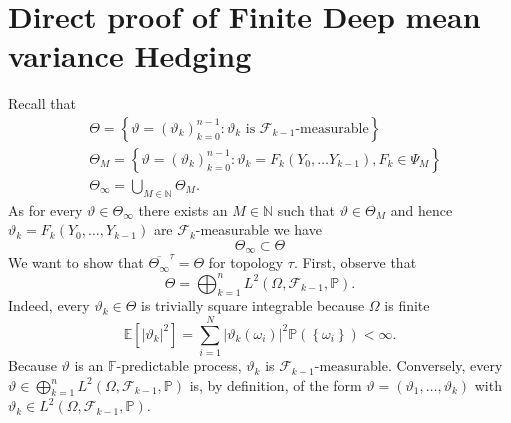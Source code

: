 \documentclass[11pt,a4paper,twoside,openany]{report}
\theoremstyle{plain} %
\theoremstyle{definition} %
\theoremstyle{remark} %
\begin{document}
\section{Direct proof of Finite Deep mean variance Hedging}\label{Appendix:Direct proof of Finite Deep mean variance Hedging}
    Recall that 
    \begin{align}
        &\Theta=\left\{\vartheta=(\vartheta_k)_{k=0}^{n-1}:\vartheta_k \text{ is }\mathcal{F}_{k-1}\text{-measurable}\right\}\\
        &\Theta_M=\left\{\vartheta=(\vartheta_k)_{k=0}^{n-1}:\vartheta_k=F_k(Y_0,\dots Y_{k-1}),F_k\in\Psi_M\right\}\\
        &\Theta_{\infty}=\bigcup_{M\in\mathbb{N}}\Theta_M.
    \end{align}
    As for every \(\vartheta\in\Theta_{\infty}\) there exists an \(M\in\mathbb{N}\) such that \(\vartheta\in\Theta_M\) and hence \(\vartheta_k=F_k(Y_0,\dots,Y_{k-1})\) are \(\mathcal{F}_{k}\)-measurable we have 
    \begin{equation}
        \Theta_{\infty}\subset\Theta
    \end{equation}
    We want to show that \(\overline{\Theta_{\infty}}^{\tau}=\Theta\) for topology \(\tau\).
   First, observe that 
    \begin{equation}
    \Theta=\bigoplus_{k=1}^{n}L^2(\Omega,\mathcal{F}_{k-1},\mathbb{P}).
    \end{equation}
    Indeed, every \(\vartheta_k\in\Theta\) is trivially square integrable because \(\Omega\) is finite
    \begin{equation}
        \mathbb{E}[|\vartheta_k|^2]=\sum_{i=1}^N|\vartheta_k(\omega_i)|^2\mathbb{P}(\left\{\omega_i\right\})<\infty.
    \end{equation}
    Because \(\vartheta\) is an \(\mathbb{F}\)-predictable process, \(\vartheta_k\) is \(\mathcal{F}_{k-1}\)-measurable. Conversely, every \(\vartheta\in\bigoplus_{k=1}^{n}L^2(\Omega,\mathcal{F}_{k-1},\mathbb{P})\) is, by definition, of the form \(\vartheta=(\vartheta_1,\dots,\vartheta_k)\) with \(\vartheta_k\in L^2(\Omega,\mathcal{F}_{k-1},\mathbb{P})\). 
\end{document}
